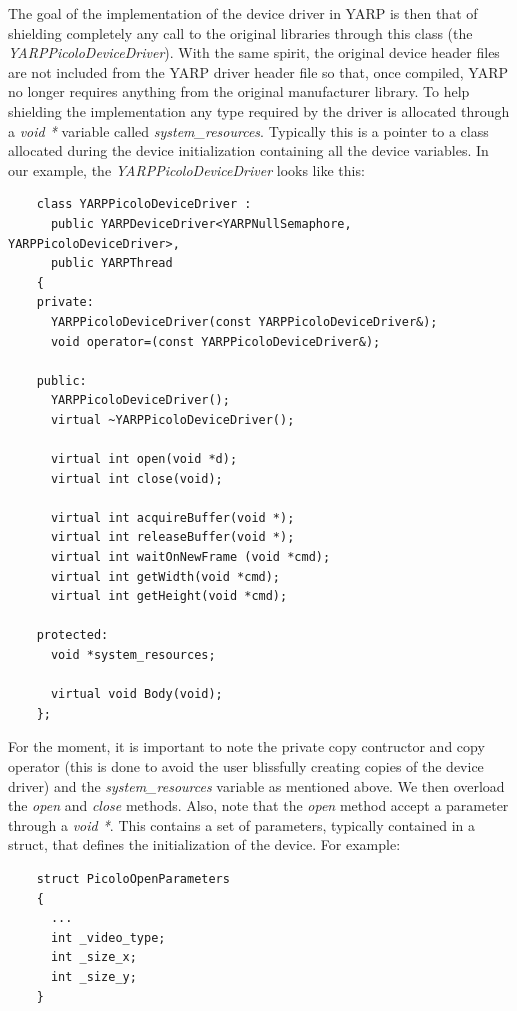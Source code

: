 The goal of the implementation of the device driver in YARP is then that of
shielding completely any call to the original libraries through this class (the
{\em YARPPicoloDeviceDriver}). With the same spirit, the original device header
files are not included from the YARP driver header file so that, once compiled,
YARP no longer requires anything from the original manufacturer library. To help
shielding the implementation any type required by the driver is allocated
through a {\em void *} variable called {\em system\_resources}. Typically this
is a pointer to a class allocated during the device initialization containing
all the device variables. In our example, the {\em YARPPicoloDeviceDriver} looks
like this:

\begin{verbatim}
    class YARPPicoloDeviceDriver : 
      public YARPDeviceDriver<YARPNullSemaphore, YARPPicoloDeviceDriver>, 
      public YARPThread
    {
    private:
      YARPPicoloDeviceDriver(const YARPPicoloDeviceDriver&);
      void operator=(const YARPPicoloDeviceDriver&);

    public:
      YARPPicoloDeviceDriver();
      virtual ~YARPPicoloDeviceDriver();

      virtual int open(void *d);
      virtual int close(void);

      virtual int acquireBuffer(void *);
      virtual int releaseBuffer(void *);
      virtual int waitOnNewFrame (void *cmd);
      virtual int getWidth(void *cmd);
      virtual int getHeight(void *cmd);

    protected:
      void *system_resources;

      virtual void Body(void);
    };
\end{verbatim}

For the moment, it is important to note the private copy contructor and copy operator (this is done to avoid the user blissfully creating copies of the device driver) and the {\em system\_resources} variable as mentioned above. We then overload the {\em open} and {\em close} methods. Also, note that the {\em open} method accept a parameter through a {\em void *}. This contains a set of parameters, typically contained in a struct, that defines the initialization of the device. For example: 

\begin{verbatim}
    struct PicoloOpenParameters
    { 
      ...
      int _video_type;
      int _size_x;
      int _size_y;
    }
\end{verbatim}

